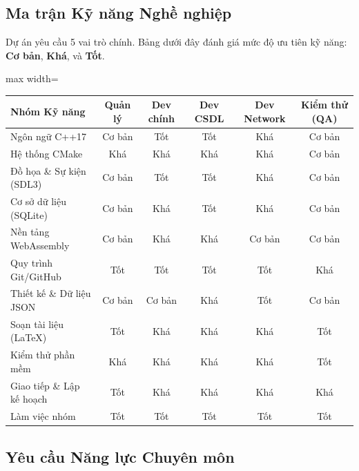 \documentclass[12pt,a4paper]{article}
\begin{document}
\subsection{Ma trận Kỹ năng Nghề nghiệp}

Dự án yêu cầu 5 vai trò chính. Bảng dưới đây đánh giá mức độ ưu tiên kỹ năng: \textbf{Cơ bản}, \textbf{Khá}, và \textbf{Tốt}.

\begin{center}
\begin{adjustbox}{max width=\linewidth}
\begin{tabular}{|p{4.5cm}|c|c|c|c|c|}
\hline
\rowcolor{gray!25}
\textbf{Nhóm Kỹ năng} & \textbf{Quản lý} & \textbf{Dev chính} & \textbf{Dev CSDL} & \textbf{Dev  Network} & \textbf{Kiểm thử (QA)} \\
\hline
Ngôn ngữ C++17 & Cơ bản & Tốt & Tốt & Khá & Cơ bản \\
\hline
Hệ thống CMake & Khá & Khá & Khá & Khá & Cơ bản \\
\hline
Đồ họa \& Sự kiện (SDL3) & Cơ bản & Tốt & Tốt & Khá & Cơ bản \\
\hline
Cơ sở dữ liệu (SQLite) & Cơ bản & Khá & Tốt & Khá & Cơ bản \\
\hline
Nền tảng WebAssembly & Cơ bản & Khá & Khá & Cơ bản & Cơ bản \\
\hline
Quy trình Git/GitHub & Tốt & Tốt & Tốt & Tốt & Khá \\
\hline
Thiết kế \& Dữ liệu JSON & Cơ bản & Cơ bản & Khá & Tốt & Cơ bản \\
\hline
Soạn tài liệu (LaTeX) & Tốt & Khá & Khá & Khá & Tốt \\
\hline
Kiểm thử phần mềm & Khá & Khá & Khá & Khá & Tốt \\
\hline
Giao tiếp \& Lập kế hoạch & Tốt & Khá & Khá & Khá & Khá \\
\hline
Làm việc nhóm & Tốt & Tốt & Tốt & Tốt & Tốt \\
\hline
\end{tabular}
\end{adjustbox}
\end{center}

\subsection{Yêu cầu Năng lực Chuyên môn}
\end{document}

